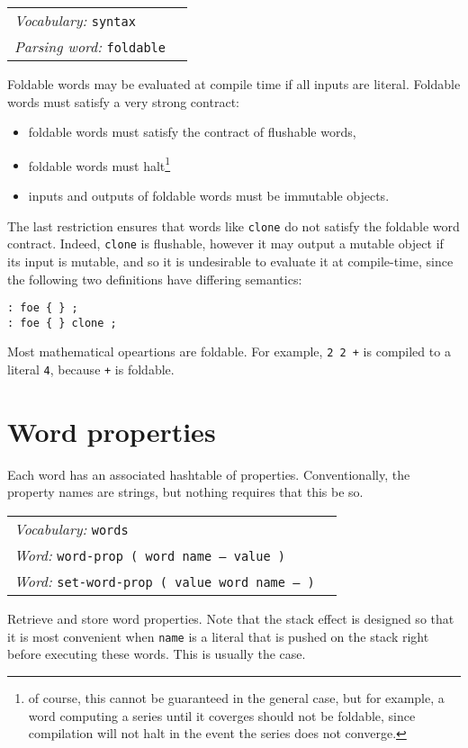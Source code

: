 \documentclass{book}
\newcommand{\vocabulary}[1]{\emph{Vocabulary:} \texttt{#1}&\\}
\newcommand{\parsingword}[2]{\index{\texttt{#1}}\emph{Parsing word:} \texttt{#2}&\\}
\newcommand{\ordinaryword}[2]{\index{\texttt{#1}}\emph{Word:} \texttt{#2}&\\}
\newcommand{\wordtable}[1]{


\begin{tabularx}{12cm}{lX}
\hline
#1
\hline
\end{tabularx}

}
\begin{document}
\wordtable{
\vocabulary{syntax}
\parsingword{foldable}{foldable}
}
Foldable words may be evaluated at compile time if all inputs are literal. Foldable words must satisfy a very strong contract:
\begin{itemize}
\item foldable words must satisfy the contract of flushable words,
\item foldable words must halt\footnote{of course, this cannot be guaranteed in the general case, but for example, a word computing a series until it coverges should not be foldable, since compilation will not halt in the event the series does not converge.}
\item inputs and outputs of foldable words must be immutable objects.
\end{itemize}
The last restriction ensures that words like \verb|clone| do not satisfy the foldable word contract. Indeed, \verb|clone| is flushable, however it may output a mutable object if its input is mutable, and so it is undesirable to evaluate it at compile-time, since the following two definitions have differing semantics:
\begin{verbatim}
: foe { } ;
: foe { } clone ;
\end{verbatim}
Most mathematical opeartions are foldable. For example, \verb|2 2 +| is compiled to a literal \verb|4|, because \verb|+| is foldable.

\section{Word properties}\label{word-props}


Each word has an associated hashtable of properties. Conventionally, the property names are strings, but nothing requires that this be so.

\wordtable{
\vocabulary{words}
\ordinaryword{word-prop}{word-prop ( word name -- value )}
\ordinaryword{set-word-prop}{set-word-prop ( value word name -- )}

}
Retrieve and store word properties. Note that the stack effect is designed so that it is most convenient when \texttt{name} is a literal that is pushed on the stack right before executing these words. This is usually the case.
\end{document}
